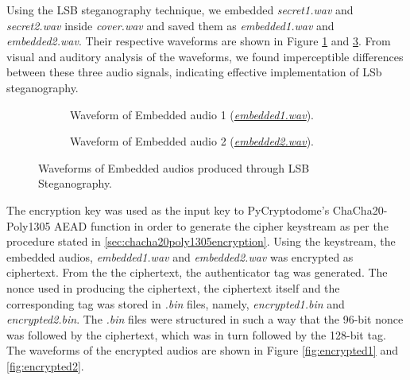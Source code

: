 \documentclass[a4paper]{cas-sc}
\begin{document}
Using the LSB steganography technique, we embedded \textit{secret1.wav} and \textit{secret2.wav} inside \textit{cover.wav} and saved them as \textit{embedded1.wav} and \textit{embedded2.wav}. Their respective waveforms are shown in Figure \ref{fig:embeddedAudio1} and \ref{fig:embeddedAudio2}. From visual and auditory analysis of the waveforms, we found imperceptible differences between these three audio signals, indicating effective implementation of LSb steganography.
\begin{figure}[pos=h]
    \begin{subfigure}[!h]{0.45\textwidth}
        \begin{center}
            \centering
            
            \caption{Waveform of Embedded audio 1 (\href{https://drive.google.com/file/d/1QLpjPCV-qFr1sKiN3rxpOOmUICOiu5hA/view?usp=drive_link}{\textit{embedded1.wav}}).}
            \label{fig:embeddedAudio1}
        \end{center}
    \end{subfigure}
    \hfill
    \begin{subfigure}[!h]{0.45\textwidth}
        \begin{center}
            
            \caption{Waveform of Embedded audio 2 (\href{https://drive.google.com/file/d/1weMUGkD9NFAO6HAVIQ7LOt6ksLJKHcn6/view?usp=drive_link}{\textit{embedded2.wav}}).}
            \label{fig:embeddedAudio2}
        \end{center}
    \end{subfigure}
    \caption{Waveforms of Embedded audios produced through LSB Steganography.}
\end{figure}

The encryption key was used as the input key to PyCryptodome's ChaCha20-Poly1305 AEAD function in order to generate the cipher keystream as per the procedure stated in \ref{sec:chacha20poly1305encryption}. Using the keystream, the embedded audios, \textit{embedded1.wav} and \textit{embedded2.wav} was encrypted as ciphertext. From the the ciphertext, the authenticator tag was generated. The nonce used in producing the ciphertext, the ciphertext itself and the corresponding tag was stored in \textit{.bin} files, namely, \textit{encrypted1.bin} and \textit{encrypted2.bin}. The \textit{.bin} files were structured in such a way that the 96-bit nonce was followed by the ciphertext, which was in turn followed by the 128-bit tag. The waveforms of the encrypted audios are shown in Figure \ref{fig:encrypted1} and \ref{fig:encrypted2}.
\end{document}
